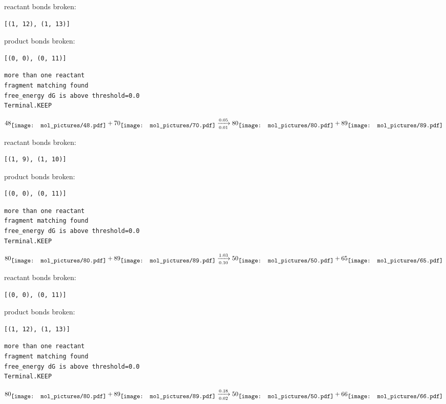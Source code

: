 \documentclass{article}
\begin{document}
reactant bonds broken:\begin{verbatim}
[(1, 12), (1, 13)]
\end{verbatim}
product bonds broken:\begin{verbatim}
[(0, 0), (0, 11)]
\end{verbatim}




\vspace{1cm}
\begin{verbatim}
more than one reactant
fragment matching found
free_energy dG is above threshold=0.0
Terminal.KEEP
\end{verbatim}
$$
48
\raisebox{-.5\height}{\texttt{[image: mol\_pictures/48.pdf]}}
+
70
\raisebox{-.5\height}{\texttt{[image: mol\_pictures/70.pdf]}}
\xrightarrow[0.01]{0.05}
80
\raisebox{-.5\height}{\texttt{[image: mol\_pictures/80.pdf]}}
+
89
\raisebox{-.5\height}{\texttt{[image: mol\_pictures/89.pdf]}}
$$


reactant bonds broken:\begin{verbatim}
[(1, 9), (1, 10)]
\end{verbatim}
product bonds broken:\begin{verbatim}
[(0, 0), (0, 11)]
\end{verbatim}




\vspace{1cm}
\begin{verbatim}
more than one reactant
fragment matching found
free_energy dG is above threshold=0.0
Terminal.KEEP
\end{verbatim}
$$
80
\raisebox{-.5\height}{\texttt{[image: mol\_pictures/80.pdf]}}
+
89
\raisebox{-.5\height}{\texttt{[image: mol\_pictures/89.pdf]}}
\xrightarrow[0.10]{1.03}
50
\raisebox{-.5\height}{\texttt{[image: mol\_pictures/50.pdf]}}
+
65
\raisebox{-.5\height}{\texttt{[image: mol\_pictures/65.pdf]}}
$$


reactant bonds broken:\begin{verbatim}
[(0, 0), (0, 11)]
\end{verbatim}
product bonds broken:\begin{verbatim}
[(1, 12), (1, 13)]
\end{verbatim}




\vspace{1cm}
\begin{verbatim}
more than one reactant
fragment matching found
free_energy dG is above threshold=0.0
Terminal.KEEP
\end{verbatim}
$$
80
\raisebox{-.5\height}{\texttt{[image: mol\_pictures/80.pdf]}}
+
89
\raisebox{-.5\height}{\texttt{[image: mol\_pictures/89.pdf]}}
\xrightarrow[0.02]{0.18}
50
\raisebox{-.5\height}{\texttt{[image: mol\_pictures/50.pdf]}}
+
66
\raisebox{-.5\height}{\texttt{[image: mol\_pictures/66.pdf]}}
$$
\end{document}
